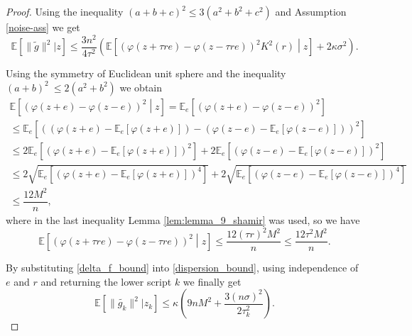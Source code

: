 \documentclass[runningheads]{llncs}
\newcommand{\alexanderb}[1]{\todo[inline]{{\textbf{Alexander B.:} \emph{#1}}}}
\newcommand{\E}{{\mathbb E}}
\def\E{\mathbb E}
\begin{document}
\begin{proof}
Using the inequality $(a+b+c)^2 \leq 3(a^2 + b^2 + c^2)$ and Assumption \ref{noise-ass} we get
\begin{equation}\label{dispersion_bound}
    \E \left[ \| \widetilde{g} \|^2 | z \right] 
    \leq \dfrac{3n^2}{4\tau^2} \left( \E\left[(\varphi(z+\tau r e) - \varphi(z - \tau r e))^2 K^2(r) \middle| z \right] + 2\kappa \sigma^2 \right).
\end{equation}



Using the symmetry of Euclidean unit sphere and the inequality $(a+b)^2 \ \leq 2(a^2 + b^2)$ we obtain
\begin{multline}
    \E \left[ \left(\varphi(z+e) -\varphi(z-e)\right)^2 \middle| z \right] = \E_e \left[ \left(\varphi(z+e) -\varphi(z-e)\right)^2  \right] \\
    \leq \E_e \left[ \left( \left(\varphi(z+e) - \E_e [\varphi(z+e)]\right) - \left(\varphi(z-e) - \E_e [\varphi(z-e)]\right) \right)^2  \right]\\
    \leq 2\E_e \left[ \left(\varphi(z+e) - \E_e [\varphi(z+e)]\right)^2 \right] + 2\E_e \left[ \left(\varphi(z-e) - \E_e [\varphi(z-e)]\right)^2 \right] \\
    \leq 2\sqrt{\E_e \left[ \left(\varphi(z+e) - \E_e [\varphi(z+e)]\right)^4 \right]} + 2\sqrt{\E_e \left[ \left(\varphi(z-e) - \E_e [\varphi(z-e)]\right)^4 \right]} \\
    \leq \dfrac{12M^2}{n},
\end{multline}
where in the last inequality Lemma \ref{lem:lemma_9_shamir} was used, so we have
\begin{equation}\label{delta_f_bound}
    \E \left[ \left(\varphi(z+\tau re) -\varphi(z-\tau re)\right)^2 \middle| z \right] \leq \dfrac{12(\tau r)^2 M^2}{n} \leq \dfrac{12 \tau^2 M^2}{n}.
\end{equation}

By substituting \eqref{delta_f_bound} into \eqref{dispersion_bound}, using independence of $e$ and $r$ and returning the lower script $k$ we finally get
\begin{equation}\label{step3}
    \E \left[ \| \widetilde{g_k} \|^2 | z_k \right] 
    \leq \kappa \left(9 n M^2  + \dfrac{3(n\sigma)^2}{2\tau_k^2} \right).
\end{equation}


\end{proof}
\end{document}
